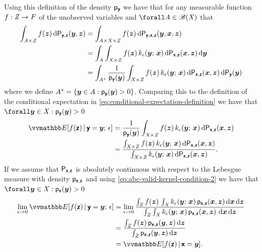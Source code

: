 Using this definition of the density $\mathsf{p}_{\boldsymbol{\mathsf{y}}}$ we have that for any measurable function $f : \mathit{Z} \to \mathit{F}$ of the unobserved variables and $\forall \set{A} \in \borel(\set{X})$ that
\begin{align}\label{eq:abc-conditional-expectation-derivation}
  \int_{\mathit{A} \times \mathit{Z}} 
    f(\boldsymbol{z}) 
  \,\mathrm{d}\mathsf{P}_{\boldsymbol{\mathsf{y}},\boldsymbol{\mathsf{z}}}(\boldsymbol{y},\boldsymbol{z}) &=
  \int_{\mathit{A} \times \mathit{X} \times \mathit{Z}} 
    f(\boldsymbol{z}) 
  \,\mathrm{d}\mathsf{P}_{\boldsymbol{\mathsf{y}},\boldsymbol{\mathsf{x}},\boldsymbol{\mathsf{z}}}(\boldsymbol{y},\boldsymbol{x},\boldsymbol{z})\\
  &=
  \int_{\mathit{A}} \int_{\mathit{X}\times\mathit{Z}}
    f(\boldsymbol{z})\,k_{\epsilon}(\boldsymbol{y};\,\boldsymbol{x})
  \,\mathrm{d}\mathsf{P}_{\boldsymbol{\mathsf{x}},\boldsymbol{\mathsf{z}}}(\boldsymbol{x},\boldsymbol{z})\,\mathrm{d}\boldsymbol{y}\\
  &=
  \int_{\mathit{A}^*} \frac{1}{\mathsf{p}_{\boldsymbol{\mathsf{y}}}(\boldsymbol{y})}
  \int_{\mathit{X}\times\mathit{Z}}
    f(\boldsymbol{z})\,k_{\epsilon}(\boldsymbol{y};\,\boldsymbol{x})
  \,\mathrm{d}\mathsf{P}_{\boldsymbol{\mathsf{x}},\boldsymbol{\mathsf{z}}}(\boldsymbol{x},\boldsymbol{z})\,\mathrm{d}\mathsf{P}_{\boldsymbol{\mathsf{y}}}(\boldsymbol{y})
\end{align}
where we define $\mathit{A}^* = \lbrace \boldsymbol{y} \in \mathit{A} : \mathsf{p}_{\boldsymbol{\mathsf{y}}}(\boldsymbol{y}) > 0 \rbrace$. Comparing this to the definition of the conditional expectation in \eqref{eq:conditional-expectation-definition} we have that $\forall \vct{y} \in \set{X} : \pden{\rvct{y}}(\vct{y}) > 0$
\begin{align}
  \label{eq:abc-expectation-1}
  \expc{f(\rvct{z}) \gvn \rvct{y} = \vct{y};\,\epsilon} 
  &=
  \frac{1}{\pden{\rvct{y}}(\vct{y})}
  \int_{\set{X}\times\set{Z}}
    f(\vct{z})\,k_{\epsilon}(\vct{y};\,\vct{x})
  \,\dr\prob{\rvct{x},\rvct{z}}(\vct{x},\vct{z})
  \\
  \label{eq:abc-expectation-2}
  &=
  \frac{
  \int_{\set{X}\times\set{Z}}
    f(\vct{z})\,k_{\epsilon}(\vct{y};\,\vct{x})
  \,\dr\prob{\rvct{x},\rvct{z}}(\vct{x},\vct{z})
  }
  {
  \int_{\set{X}\times\set{Z}}
    k_\epsilon(\vct{y};\,\vct{x})\,
  \dr\prob{\rvct{x},\rvct{z}}(\vct{x},\vct{z})
  }.
\end{align}
If we assume that $\mathsf{P}_{\boldsymbol{\mathsf{x}},\boldsymbol{\mathsf{z}}}$ is absolutely continuous with respect to the Lebesgue measure with density $\mathsf{p}_{\boldsymbol{\mathsf{x}},\boldsymbol{\mathsf{z}}}$ and using \eqref{eq:abc-valid-kernel-condition-2} we have that $\forall \vct{y} \in \set{X} : \pden{\rvct{x}}(\vct{y}) > 0$
\begin{align}
  \lim_{\epsilon \to 0}
  \expc{f(\rvct{z}) \gvn \rvct{y} = \vct{y};\,\epsilon} &=
  \lim_{\epsilon \to 0}
  \frac{
  \int_{\set{Z}} f(\vct{z})\, \int_{\set{X}}
    k_{\epsilon}(\vct{y};\,\vct{x})\,
    \pden{\rvct{x},\rvct{z}}(\vct{x},\vct{z})
  \,\dr\vct{x}\,\dr\vct{z}
  }
  {
   \int_{\set{Z}}\int_{\set{X}}
    k_\epsilon(\vct{y};\,\vct{x})\,\pden{\rvct{x},\rvct{z}}(\vct{x},\vct{z})\,
  \,\dr\vct{x}\,\dr\vct{z}
  }\\
  &=
  \frac{
  \int_{\set{Z}}
    f(\vct{z})\,\pden{\rvct{x},\rvct{z}}(\vct{y},\vct{z})
  \,\dr\vct{z}}
  {\int_{\set{Z}}\pden{\rvct{x},\rvct{z}}(\vct{y},\vct{z})\,\dr\vct{z}}\\
  &=
  \expc{f(\rvct{z}) \gvn \rvct{x} = \vct{y}}.
\end{align}
